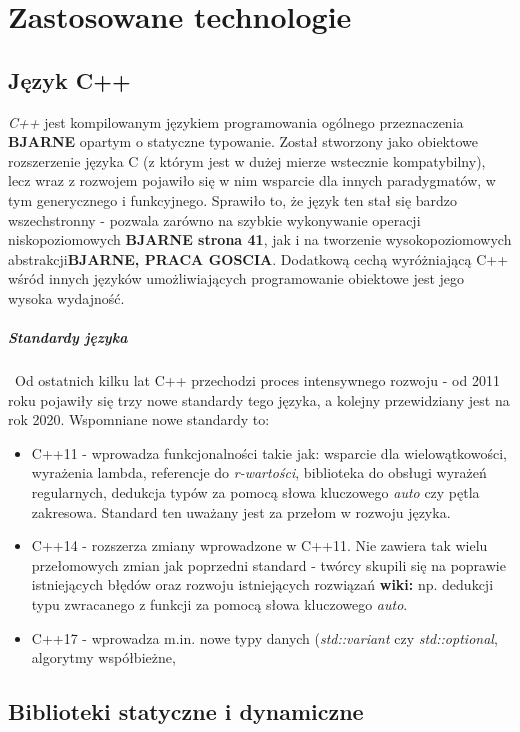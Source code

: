 \chapter{Zastosowane technologie}
\label{cha:teoria}

\section{Język C++}
\textit{C++} jest kompilowanym językiem programowania ogólnego przeznaczenia \textbf{BJARNE} opartym o statyczne typowanie. Został stworzony jako obiektowe rozszerzenie języka C (z którym jest w dużej mierze wstecznie kompatybilny), lecz wraz z rozwojem pojawiło się w nim wsparcie dla innych paradygmatów, w tym generycznego i funkcyjnego. Sprawiło to, że język ten stał się bardzo wszechstronny - pozwala zarówno na szybkie wykonywanie operacji niskopoziomowych \textbf{BJARNE strona 41}, jak i na tworzenie wysokopoziomowych abstrakcji\textbf{BJARNE, PRACA GOSCIA}. Dodatkową cechą wyróżniającą C++ wśród innych języków umożliwiających programowanie obiektowe jest jego wysoka wydajność.

\paragraph*{Standardy języka} \mbox{} \
Od ostatnich kilku lat C++ przechodzi proces intensywnego rozwoju - od 2011 roku pojawiły się trzy nowe standardy tego języka, a kolejny przewidziany jest na rok 2020. Wspomniane nowe standardy to:
\begin{itemize}
\item C++11 - wprowadza funkcjonalności takie jak: wsparcie dla wielowątkowości, wyrażenia lambda, referencje do \textit{r-wartości}, biblioteka do obsługi wyrażeń regularnych, dedukcja typów za pomocą słowa kluczowego \textit{auto} czy pętla zakresowa. Standard ten uważany jest za przełom w rozwoju języka.
\item C++14 - rozszerza zmiany wprowadzone w C++11. Nie zawiera tak wielu przełomowych zmian jak poprzedni standard - twórcy skupili się na poprawie istniejących błędów oraz rozwoju istniejących rozwiązań \textbf{wiki:} np. dedukcji typu zwracanego z funkcji za pomocą słowa kluczowego \textit{auto}.
\item C++17 - wprowadza m.in. nowe typy danych (\textit{std::variant} czy \textit{std::optional}, algorytmy współbieżne, 
\end{itemize}
\section{Biblioteki statyczne i dynamiczne}
